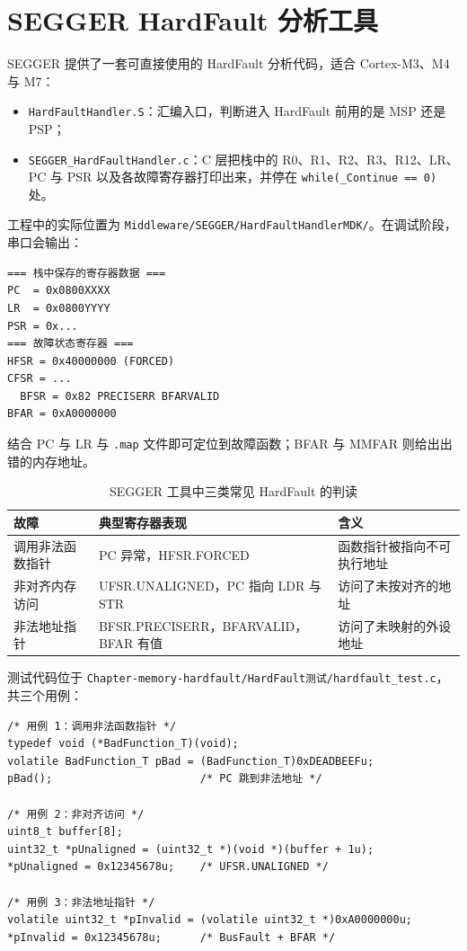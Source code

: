 \section{SEGGER HardFault 分析工具}

SEGGER 提供了一套可直接使用的 HardFault 分析代码，适合 Cortex-M3、M4 与 M7：

\begin{itemize}
\item \texttt{HardFaultHandler.S}：汇编入口，判断进入 HardFault 前用的是 MSP 还是 PSP；
\item \texttt{SEGGER\_HardFaultHandler.c}：C 层把栈中的 R0、R1、R2、R3、R12、LR、PC 与 PSR 以及各故障寄存器打印出来，并停在 \texttt{while(\_Continue == 0)} 处。
\end{itemize}

工程中的实际位置为 \texttt{Middleware/SEGGER/HardFaultHandlerMDK/}。在调试阶段，串口会输出：

\begin{lstlisting}
=== 栈中保存的寄存器数据 ===
PC  = 0x0800XXXX
LR  = 0x0800YYYY
PSR = 0x...
=== 故障状态寄存器 ===
HFSR = 0x40000000 (FORCED)
CFSR = ...
  BFSR = 0x82 PRECISERR BFARVALID
BFAR = 0xA0000000
\end{lstlisting}

结合 PC 与 LR 与 \texttt{.map} 文件即可定位到故障函数；BFAR 与 MMFAR 则给出出错的内存地址。

\begin{table}[htbp]
\centering \caption{SEGGER 工具中三类常见 HardFault 的判读} \label{tab:segger-fault}
    \begin{tabular}{lll}
        \toprule
        故障 & 典型寄存器表现 & 含义 \\
        \midrule
        调用非法函数指针 & PC 异常，HFSR.FORCED & 函数指针被指向不可执行地址 \\
        非对齐内存访问 & UFSR.UNALIGNED，PC 指向 LDR 与 STR & 访问了未按对齐的地址 \\
        非法地址指针 & BFSR.PRECISERR，BFARVALID，BFAR 有值 & 访问了未映射的外设地址 \\
        \bottomrule
    \end{tabular}
\end{table}

测试代码位于 \texttt{Chapter-memory-hardfault/HardFault测试/hardfault\_test.c}，共三个用例：

\begin{lstlisting}[style=c]
/* 用例 1：调用非法函数指针 */
typedef void (*BadFunction_T)(void);
volatile BadFunction_T pBad = (BadFunction_T)0xDEADBEEFu;
pBad();                       /* PC 跳到非法地址 */

/* 用例 2：非对齐访问 */
uint8_t buffer[8];
uint32_t *pUnaligned = (uint32_t *)(void *)(buffer + 1u);
*pUnaligned = 0x12345678u;    /* UFSR.UNALIGNED */

/* 用例 3：非法地址指针 */
volatile uint32_t *pInvalid = (volatile uint32_t *)0xA0000000u;
*pInvalid = 0x12345678u;      /* BusFault + BFAR */
\end{lstlisting}

